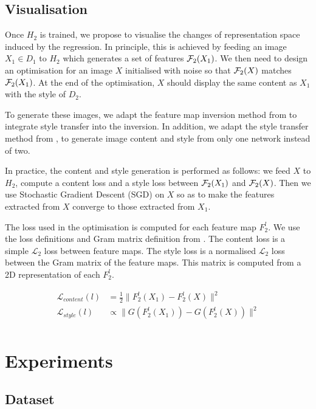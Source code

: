 \documentclass{bmvc2k}
\begin{document}
\subsection{Visualisation}
Once $H_2$ is trained, we propose to visualise the changes of representation space induced
by the regression. In principle, this is achieved by feeding an image $X_1 \in D_1$ to $H_2$ 
which generates a set of features ${\cal F}_2(X_1)$.  We then need to design an optimisation for an image $X$ initialised with noise so that ${\cal F}_2(X)$ 
matches ${\cal F}_2(X_1)$. 
At the end of the optimisation, $X$ should display the same content as $X_1$ with the 
style of $D_2$. 

To generate these images, we adapt the feature map inversion method from
\cite{Mahendran_2015_CVPR} to integrate style transfer into the inversion. In
addition, we adapt the style transfer method from \cite{gatys2016image},
\cite{johnson2016perceptual} to generate image content and style from only one
network instead of two. 

In practice, the content and style generation is performed as follows: we feed $X$ to $H_2$, 
compute a content loss and a style loss between ${\cal F}_2(X_1)$ 
and ${\cal F}_2(X)$. 
Then we use Stochastic Gradient Descent (SGD)
on $X$ so as to make the features extracted from $X$ converge to those extracted
from $X_1$.

The loss used in the optimisation is computed for each feature map $F^l_2$. We use the loss definitions and Gram matrix definition 
from \cite{gatys2016image}. The content loss is a simple $\mathcal{L}_2$ loss
between feature maps. The style loss is a normalised $\mathcal{L}_2$ loss 
between the Gram matrix of the feature maps. This matrix is computed from a 2D
representation of each $F^l_2$.

\begin{equation}
  \begin{split}
    \mathcal{L}_{content}(l)  &= \frac{1}{2} \|F^l_2(X_1) - F^l_2(X)\|^2 \\ 
    \mathcal{L}_{style}(l)    &\propto \|G(F^l_2(X_1))-G(F^l_2(X))\|^2 \\ 
  \end{split}
\end{equation}

\section{Experiments}

\subsection{Dataset}
\end{document}
